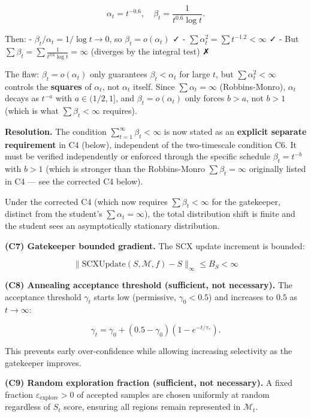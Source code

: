 \documentclass[
  12pt,
]{article}
\begin{document}
\[\alpha_t = t^{-0.6}, \quad \beta_t = \frac{1}{t^{0.6} \log t}.\]

Then: - \(\beta_t / \alpha_t = 1/\log t \to 0\), so
\(\beta_t = o(\alpha_t)\) ✓ -
\(\sum \alpha_t^2 = \sum t^{-1.2} < \infty\) ✓ - But
\(\sum \beta_t = \sum \frac{1}{t^{0.6} \log t} = \infty\) (diverges by
the integral test) ✗

The flaw: \(\beta_t = o(\alpha_t)\) only guarantees
\(\beta_t < \alpha_t\) for large \(t\), but \(\sum \alpha_t^2 < \infty\)
controls the \textbf{squares} of \(\alpha_t\), not \(\alpha_t\) itself.
Since \(\sum \alpha_t = \infty\) (Robbins-Monro), \(\alpha_t\) decays as
\(t^{-a}\) with \(a \in (1/2, 1]\), and \(\beta_t = o(\alpha_t)\) only
forces \(b > a\), not \(b > 1\) (which is what \(\sum \beta_t < \infty\)
requires).

\textbf{Resolution.} The condition
\(\sum_{t=1}^\infty \beta_t < \infty\) is now stated as an
\textbf{explicit separate requirement} in C4 (below), independent of the
two-timescale condition C6. It must be verified independently or
enforced through the specific schedule \(\beta_t = t^{-b}\) with
\(b > 1\) (which is stronger than the Robbins-Monro
\(\sum \beta_t = \infty\) originally listed in C4 --- see the corrected
C4 below).

Under the corrected C4 (which now requires \(\sum \beta_t < \infty\) for
the gatekeeper, distinct from the student's \(\sum \alpha_t = \infty\)),
the total distribution shift is finite and the student sees an
asymptotically stationary distribution.

\textbf{(C7) Gatekeeper bounded gradient.} The SCX update increment is
bounded:

\[
\|\text{SCXUpdate}(S, \mathcal{M}, f) - S\|_\infty \leq B_S < \infty
\]

\textbf{(C8) Annealing acceptance threshold (sufficient, not
necessary).} The acceptance threshold \(\gamma_t\) starts low
(permissive, \(\gamma_0 < 0.5\)) and increases to \(0.5\) as
\(t \to \infty\):

\[\gamma_t = \gamma_0 + (0.5 - \gamma_0)(1 - e^{-t/\tau_\gamma}).\]

This prevents early over-confidence while allowing increasing
selectivity as the gatekeeper improves.

\textbf{(C9) Random exploration fraction (sufficient, not necessary).} A
fixed fraction \(\varepsilon_{\text{explore}} > 0\) of accepted samples
are chosen uniformly at random regardless of \(S_t\) score, ensuring all
regions remain represented in \(\mathcal{M}_t\).
\end{document}
